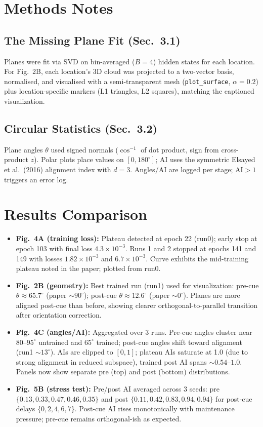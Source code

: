 \documentclass{article}
\begin{document}
\section{Methods Notes}
\subsection{The Missing Plane Fit (Sec.~3.1)}
Planes were fit via SVD on bin-averaged ($B=4$) hidden states for each location. For Fig.~2B, each location's 3D cloud was projected to a two-vector basis, normalised, and visualised with a semi-transparent mesh (\texttt{plot\_surface}, $\alpha=0.2$) plus location-specific markers (L1 triangles, L2 squares), matching the captioned visualization.

\subsection{Circular Statistics (Sec.~3.2)}
Plane angles $\theta$ used signed normals ($\cos^{-1}$ of dot product, sign from cross-product $z$). Polar plots place values on $[0,180^\circ]$; AI uses the symmetric Elsayed et al.\ (2016) alignment index with $d=3$. Angles/AI are logged per stage; AI$>1$ triggers an error log.

\section{Results Comparison}
\begin{itemize}[leftmargin=*]
    \item \textbf{Fig.~4A (training loss):} Plateau detected at epoch 22 (run0); early stop at epoch 103 with final loss $4.3\times 10^{-3}$. Runs 1 and 2 stopped at epochs 141 and 149 with losses $1.82\times 10^{-3}$ and $6.7\times 10^{-3}$. Curve exhibits the mid-training plateau noted in the paper; plotted from run0.
    \item \textbf{Fig.~2B (geometry):} Best trained run (run1) used for visualization: pre-cue $\theta\approx65.7^\circ$ (paper $\sim90^\circ$); post-cue $\theta\approx12.6^\circ$ (paper $\sim0^\circ$). Planes are more aligned post-cue than before, showing clearer orthogonal-to-parallel transition after orientation correction.
    \item \textbf{Fig.~4C (angles/AI):} Aggregated over 3 runs. Pre-cue angles cluster near $80$--$95^\circ$ untrained and $65^\circ$ trained; post-cue angles shift toward alignment (run1 $\sim13^\circ$). AIs are clipped to $[0,1]$; plateau AIs saturate at 1.0 (due to strong alignment in reduced subspace), trained post AI spans $\sim0.54$--$1.0$. Panels now show separate pre (top) and post (bottom) distributions.
    \item \textbf{Fig.~5B (stress test):} Pre/post AI averaged across 3 seeds: pre $\{0.13, 0.33, 0.47, 0.46, 0.35\}$ and post $\{0.11, 0.42, 0.83, 0.94, 0.94\}$ for post-cue delays $\{0,2,4,6,7\}$. Post-cue AI rises monotonically with maintenance pressure; pre-cue remains orthogonal-ish as expected.
\end{itemize}
\end{document}

